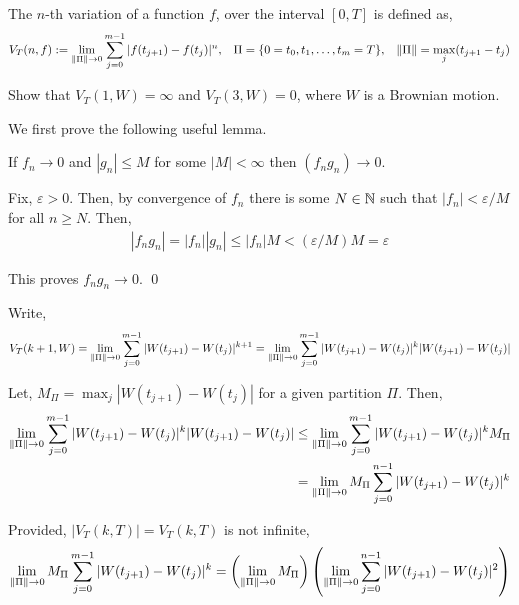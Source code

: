 \begin{problem}[Exercise 7.3]
    The \( n \)-th variation of a function \( f \), over the interval \( [0,T] \) is defined as,
    \begin{align*}
        V_T(n,f) := 
        \lim_{\left\lVert\Pi\right\rVert\to 0} \sum_{j=0}^{m-1} |f(t_{j+1})-f(t_j)|^n, && \Pi = \{0=t_0,t_1, \ldots, t_m=T\}, && \left\lVert\Pi\right\rVert = \max_j(t_{j+1}-t_{j})
    \end{align*}

    Show that \( V_T(1,W) = \infty \) and \( V_T(3,W) = 0 \), where \( W \) is a Brownian motion.
\end{problem}


\begin{solution}[Solution]
We first prove the following useful lemma.
\begin{lemma}
    If \( f_n \to 0 \) and \( |g_n| \leq M \) for some \( |M| < \infty \) then \( (f_ng_n)\to 0 \).
\end{lemma}
Fix, \( \varepsilon > 0 \). Then, by convergence of \( f_n \) there is some \( N\in\mathbb{N} \) such that \( |f_n| < \varepsilon/M \) for all \( n\geq N \). Then,
\begin{align*}
    |f_ng_n| = |f_n||g_n| \leq |f_n|M < (\varepsilon/M)M = \varepsilon
\end{align*}

This proves \( f_ng_n \to 0 \). \qed


Write,
\begin{align*}
    V_T(k+1,W) = 
    \lim_{\left\lVert\Pi\right\rVert\to 0} \sum_{j=0}^{m-1} |W(t_{j+1})-W(t_j)|^{k+1} = 
    \lim_{\left\lVert\Pi\right\rVert\to 0} \sum_{j=0}^{m-1} |W(t_{j+1})-W(t_j)|^k|W(t_{j+1})-W(t_j)|
\end{align*}

Let, \( M_\Pi = \max_j |W(t_{j+1}) - W(t_j)| \) for a given partition \( \Pi \). Then,
\begin{align*}
    \lim_{\left\lVert\Pi\right\rVert\to 0} \sum_{j=0}^{m-1} |W(t_{j+1})-W(t_j)|^k|W(t_{j+1})-W(t_j)| 
    &\leq \lim_{\left\lVert\Pi\right\rVert\to 0} \sum_{j=0}^{m-1} |W(t_{j+1})-W(t_j)|^k M_\Pi 
    \\&= \lim_{\left\lVert\Pi\right\rVert\to 0} M_\Pi \sum_{j=0}^{n-1} |W(t_{j+1})-W(t_j)|^k
\end{align*}

Provided, \( |V_T(k,T)| = V_T(k,T) \) is not infinite,
\begin{align*}
    \lim_{\left\lVert\Pi\right\rVert\to 0} M_\Pi \sum_{j=0}^{m-1} |W(t_{j+1})-W(t_j)|^k
    = \left( \lim_{\left\lVert\Pi\right\rVert\to 0} M_\Pi \right) \left( \lim_{\left\lVert\Pi\right\rVert\to 0} \sum_{j=0}^{n-1} |W(t_{j+1})-W(t_j)|^2 \right)
\end{align*}


\end{solution}
